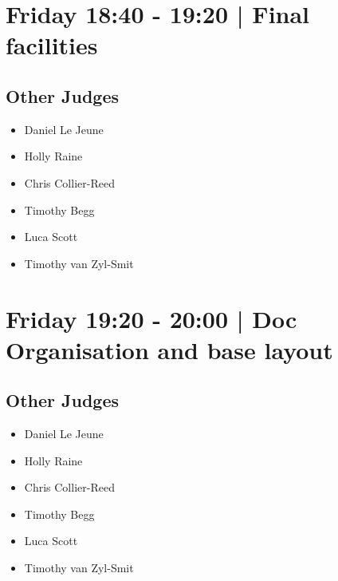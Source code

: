 \documentclass[10pt, A5]{article}
\begin{document}
            \section*{Friday 18:40
        -
        19:20
        |
         Final facilities}
        
                
        \subsection*{Other Judges}
        
            \begin{itemize}
                            \item Daniel Le Jeune
                            \item Holly Raine
                            \item Chris Collier-Reed
                            \item Timothy Begg
                            \item Luca Scott
                            \item Timothy van Zyl-Smit
                        \end{itemize}
        

            \section*{Friday 19:20
        -
        20:00
        |
         Doc Organisation and base layout}
        
                
        \subsection*{Other Judges}
        
            \begin{itemize}
                            \item Daniel Le Jeune
                            \item Holly Raine
                            \item Chris Collier-Reed
                            \item Timothy Begg
                            \item Luca Scott
                            \item Timothy van Zyl-Smit
                        \end{itemize}
        
\end{document}
